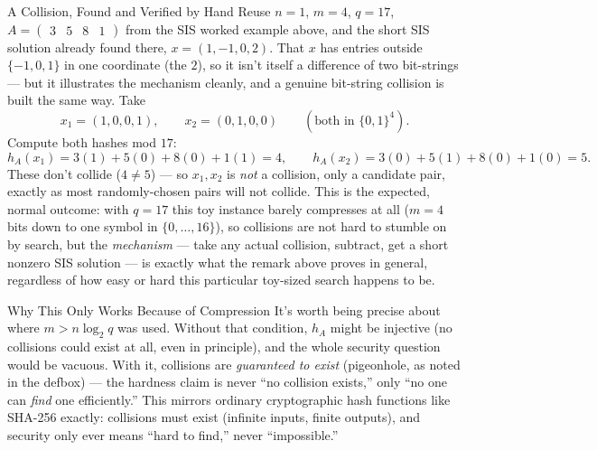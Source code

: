 \begin{exbox}{A Collision, Found and Verified by Hand}
Reuse $n=1$, $m=4$, $q=17$, $A = \begin{pmatrix}3 & 5 & 8 & 1\end{pmatrix}$ from the SIS worked example above, and the short SIS solution already found there, $x = (1,-1,0,2)$. That $x$ has entries outside $\{-1,0,1\}$ in one coordinate (the $2$), so it isn't itself a difference of two bit-strings --- but it illustrates the mechanism cleanly, and a genuine bit-string collision is built the same way. Take
$$
x_1 = (1,0,0,1), \qquad x_2 = (0,1,0,0) \qquad (\text{both in } \{0,1\}^4).
$$
Compute both hashes mod $17$:
$$
h_A(x_1) = 3(1)+5(0)+8(0)+1(1) = 4, \qquad h_A(x_2) = 3(0)+5(1)+8(0)+1(0) = 5.
$$
These don't collide ($4 \ne 5$) --- so $x_1,x_2$ is \emph{not} a collision, only a candidate pair, exactly as most randomly-chosen pairs will not collide. This is the expected, normal outcome: with $q=17$ this toy instance barely compresses at all ($m=4$ bits down to one symbol in $\{0,\ldots,16\}$), so collisions are not hard to stumble on by search, but the \emph{mechanism} --- take any actual collision, subtract, get a short nonzero SIS solution --- is exactly what the remark above proves in general, regardless of how easy or hard this particular toy-sized search happens to be.
\end{exbox}

\begin{rmkbox}{Why This Only Works Because of Compression}
It's worth being precise about where $m > n\log_2 q$ was used. Without that condition, $h_A$ might be injective (no collisions could exist at all, even in principle), and the whole security question would be vacuous. With it, collisions are \emph{guaranteed to exist} (pigeonhole, as noted in the defbox) --- the hardness claim is never ``no collision exists,'' only ``no one can \emph{find} one efficiently.'' This mirrors ordinary cryptographic hash functions like SHA-256 exactly: collisions must exist (infinite inputs, finite outputs), and security only ever means ``hard to find,'' never ``impossible.''
\end{rmkbox}

